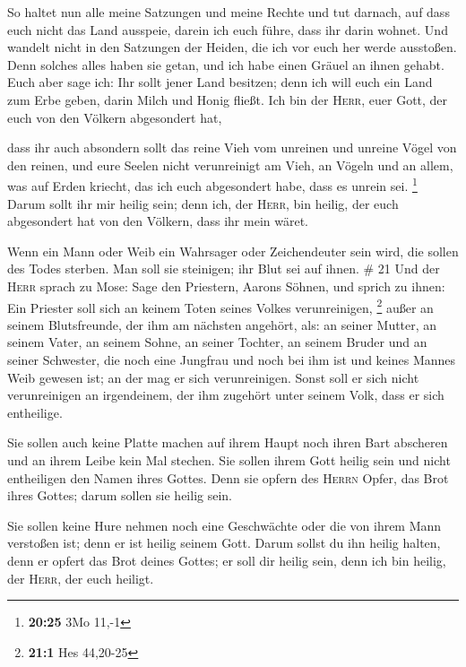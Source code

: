  So haltet nun alle meine Satzungen und meine Rechte und
tut darnach, auf dass euch nicht das Land ausspeie, darein ich euch
führe, dass ihr darin wohnet.  Und wandelt nicht in den
Satzungen der Heiden, die ich vor euch her werde ausstoßen. Denn solches
alles haben sie getan, und ich habe einen Gräuel an ihnen gehabt.
 Euch aber sage ich: Ihr sollt jener Land besitzen; denn
ich will euch ein Land zum Erbe geben, darin Milch und Honig fließt. Ich
bin der \textsc{Herr}, euer Gott, der euch von den Völkern abgesondert
hat,

 dass ihr auch absondern sollt das reine Vieh vom
unreinen und unreine Vögel von den reinen, und eure Seelen nicht
verunreinigt am Vieh, an Vögeln und an allem, was auf Erden kriecht, das
ich euch abgesondert habe, dass es unrein sei. \footnote{\textbf{20:25}
  3Mo 11,-1}  Darum sollt ihr mir heilig sein; denn ich,
der \textsc{Herr}, bin heilig, der euch abgesondert hat von den Völkern,
dass ihr mein wäret.

 Wenn ein Mann oder Weib ein Wahrsager oder Zeichendeuter
sein wird, die sollen des Todes sterben. Man soll sie steinigen; ihr
Blut sei auf ihnen. \# 21  Und der \textsc{Herr} sprach zu
Mose: Sage den Priestern, Aarons Söhnen, und sprich zu ihnen: Ein
Priester soll sich an keinem Toten seines Volkes verunreinigen,
\footnote{\textbf{21:1} Hes 44,20-25}  außer an seinem
Blutsfreunde, der ihm am nächsten angehört, als: an seiner Mutter, an
seinem Vater, an seinem Sohne, an seiner Tochter, an seinem Bruder
 und an seiner Schwester, die noch eine Jungfrau und noch
bei ihm ist und keines Mannes Weib gewesen ist; an der mag er sich
verunreinigen.  Sonst soll er sich nicht verunreinigen an
irgendeinem, der ihm zugehört unter seinem Volk, dass er sich
entheilige.

 Sie sollen auch keine Platte machen auf ihrem Haupt noch
ihren Bart abscheren und an ihrem Leibe kein Mal stechen. 
Sie sollen ihrem Gott heilig sein und nicht entheiligen den Namen ihres
Gottes. Denn sie opfern des \textsc{Herrn} Opfer, das Brot ihres Gottes;
darum sollen sie heilig sein.

 Sie sollen keine Hure nehmen noch eine Geschwächte oder
die von ihrem Mann verstoßen ist; denn er ist heilig seinem Gott.
 Darum sollst du ihn heilig halten, denn er opfert das
Brot deines Gottes; er soll dir heilig sein, denn ich bin heilig, der
\textsc{Herr}, der euch heiligt.

